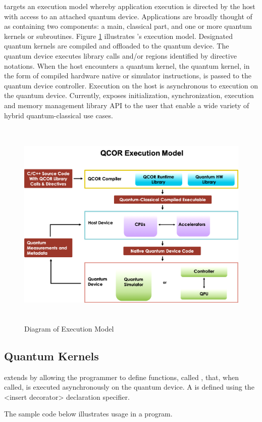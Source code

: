 \qcor targets an execution model whereby application execution is directed by the host with access to an attached quantum device. Applications are broadly thought of as containing two components: a main, classical part, and one or more quantum kernels or subroutines. Figure \ref{fig:exec_model} illustrates \qcor's execution model. Designated quantum kernels are compiled and offloaded to the quantum device. The quantum device executes \qcor library calls and/or \qcor regions identified by directive notations. When the host encounters a quantum kernel, the quantum kernel, in the form of compiled hardware native or simulator 
instructions, is passed to the quantum device controller. Execution on the host is asynchronous to execution on the quantum device. 
Currently, \qcor exposes initialization, synchronization, execution and memory management library \ac{API} to the user that enable a wide variety of hybrid quantum-classical use cases.

\begin{figure}
 \centering
 \includegraphics[width=5in,height=4in]{figures/Execution_Model_Illustration_v3.png}
  \caption{Diagram of \qcor Execution Model}
  \label{fig:exec_model}
\end{figure}


\subsection{\textbf{Quantum Kernels}}\label{subsec:kernel}
\qcor extends \CorCpp by allowing the programmer to define functions, called , that, when called, is executed asynchronously on the quantum device. A  is defined using the <insert decorator> declaration specifier. 

The sample code below illustrates  usage in a \CorCpp program.

